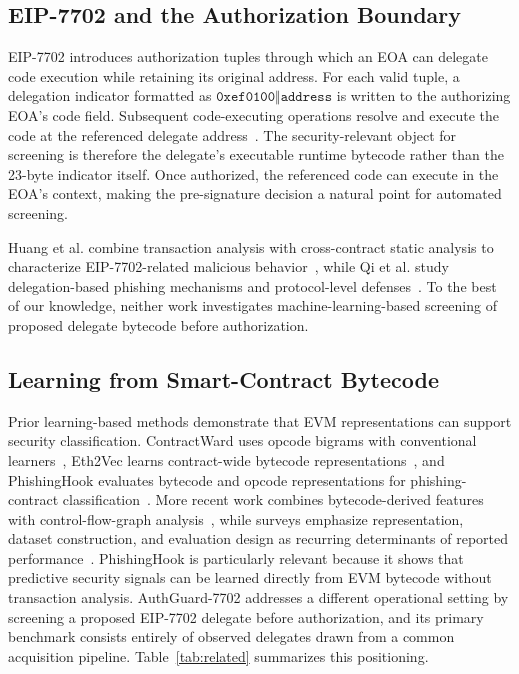 \documentclass[conference]{IEEEtran}
\newcommand{\code}[1]{\texttt{#1}}
\begin{document}
\subsection{EIP-7702 and the Authorization Boundary}

EIP-7702 introduces authorization tuples through which an EOA can delegate code execution while retaining its original address. For each valid tuple, a delegation indicator formatted as $\code{0xef0100}\Vert\code{address}$ is written to the authorizing EOA's code field. Subsequent code-executing operations resolve and execute the code at the referenced delegate address~\cite{eip7702}. The security-relevant object for screening is therefore the delegate's executable runtime bytecode rather than the 23-byte indicator itself. Once authorized, the referenced code can execute in the EOA's context, making the pre-signature decision a natural point for automated screening.

Huang et al. combine transaction analysis with cross-contract static analysis to characterize EIP-7702-related malicious behavior~\cite{huang2026darkside}, while Qi et al. study delegation-based phishing mechanisms and protocol-level defenses~\cite{qi2025eip7702}. To the best of our knowledge, neither work investigates machine-learning-based screening of proposed delegate bytecode before authorization.

\subsection{Learning from Smart-Contract Bytecode}

Prior learning-based methods demonstrate that EVM representations can support security classification. ContractWard uses opcode bigrams with conventional learners~\cite{contractward2021}, Eth2Vec learns contract-wide bytecode representations~\cite{eth2vec2022}, and PhishingHook evaluates bytecode and opcode representations for phishing-contract classification~\cite{phishinghook2025}. More recent work combines bytecode-derived features with control-flow-graph analysis~\cite{smartbugbert2025}, while surveys emphasize representation, dataset construction, and evaluation design as recurring determinants of reported performance~\cite{wang2026review}. PhishingHook is particularly relevant because it shows that predictive security signals can be learned directly from EVM bytecode without transaction analysis. AuthGuard-7702 addresses a different operational setting by screening a proposed EIP-7702 delegate before authorization, and its primary benchmark consists entirely of observed delegates drawn from a common acquisition pipeline. Table~\ref{tab:related} summarizes this positioning.
\end{document}
